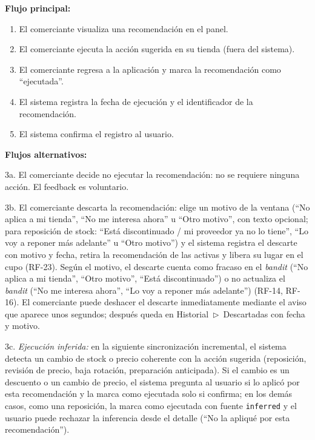 \noindent\textbf{Flujo principal:}
\begin{enumerate}
    \item El comerciante visualiza una recomendación en el panel.
    \item El comerciante ejecuta la acción sugerida en su tienda (fuera del sistema).
    \item El comerciante regresa a la aplicación y marca la recomendación como \enquote{ejecutada}.
    \item El sistema registra la fecha de ejecución y el identificador de la recomendación.
    \item El sistema confirma el registro al usuario.
\end{enumerate}

\noindent\textbf{Flujos alternativos:}

\noindent 3a. El comerciante decide no ejecutar la recomendación: no se requiere ninguna acción. El feedback es voluntario.

\noindent 3b. El comerciante descarta la recomendación: elige un motivo de la ventana (\enquote{No aplica a mi tienda}, \enquote{No me interesa ahora} u \enquote{Otro motivo}, con texto opcional; para reposición de stock: \enquote{Está discontinuado / mi proveedor ya no lo tiene}, \enquote{Lo voy a reponer más adelante} u \enquote{Otro motivo}) y el sistema registra el descarte con motivo y fecha, retira la recomendación de las activas y libera su lugar en el cupo (RF-23).
Según el motivo, el descarte cuenta como fracaso en el \emph{bandit} (\enquote{No aplica a mi tienda}, \enquote{Otro motivo}, \enquote{Está discontinuado}) o no actualiza el \emph{bandit} (\enquote{No me interesa ahora}, \enquote{Lo voy a reponer más adelante}) (RF-14, RF-16). El comerciante puede deshacer el descarte inmediatamente mediante el aviso que aparece unos segundos; después queda en Historial~$\triangleright$~Descartadas con fecha y motivo.

\noindent 3c. \textit{Ejecución inferida:} en la siguiente sincronización incremental, el sistema detecta un cambio de stock o precio coherente con la acción sugerida (reposición, revisión de precio, baja rotación, preparación anticipada). Si el cambio es un descuento o un cambio de precio, el sistema pregunta al usuario si lo aplicó por esta recomendación y la marca como ejecutada solo si confirma; en los demás casos, como una reposición, la marca como ejecutada con fuente \texttt{inferred} y el usuario puede rechazar la inferencia desde el detalle (\enquote{No la apliqué por esta recomendación}).

